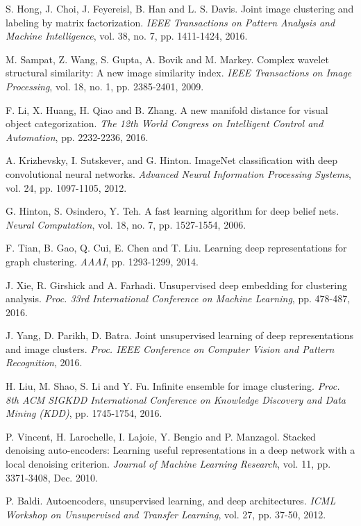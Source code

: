 \documentclass[preprint,12pt]{elsarticle}
\begin{document}
\begin{thebibliography}{99}
S. Hong, J. Choi, J. Feyereisl, B. Han and L. S. Davis. Joint image clustering and labeling by matrix factorization.
\textit{IEEE Transactions on Pattern Analysis and Machine Intelligence}, vol. 38, no. 7, pp. 1411-1424, 2016.

M. Sampat, Z. Wang, S. Gupta, A. Bovik and M. Markey. Complex wavelet structural similarity: A new image similarity index.
\textit{IEEE Transactions on Image Processing}, vol. 18, no. 1, pp. 2385-2401, 2009.

F. Li, X. Huang, H. Qiao and B. Zhang. A new manifold distance for visual object categorization.
\textit{The 12th World Congress on Intelligent Control and Automation}, pp. 2232-2236, 2016.

A. Krizhevsky, I. Sutskever, and G. Hinton. ImageNet classification with deep convolutional neural networks.
\textit{Advanced Neural Information Processing Systems}, vol. 24, pp. 1097-1105, 2012.

G. Hinton, S. Osindero, Y. Teh. A fast learning algorithm for deep belief nets.
\textit{Neural Computation}, vol. 18, no. 7, pp. 1527-1554, 2006.

F. Tian, B. Gao, Q. Cui, E. Chen and T. Liu. Learning deep representations for graph clustering.
\textit{AAAI}, pp. 1293-1299, 2014.

J. Xie, R. Girshick and A. Farhadi. Unsupervised deep embedding for clustering analysis.
\textit{Proc. 33rd International Conference on Machine Learning}, pp. 478-487, 2016.

J. Yang, D. Parikh, D. Batra. Joint unsupervised learning of deep representations and image clusters.
\textit{Proc. IEEE Conference on Computer Vision and Pattern Recognition}, 2016.

H. Liu, M. Shao, S. Li and Y. Fu. Infinite ensemble for image clustering.
\textit{Proc. 8th ACM SIGKDD International Conference on Knowledge Discovery and Data Mining (KDD)},
pp. 1745-1754, 2016.

P. Vincent, H. Larochelle, I. Lajoie, Y. Bengio and P. Manzagol. Stacked denoising auto-encoders: Learning useful representations
in a deep network with a local denoising criterion. \textit{Journal of Machine Learning Research}, vol. 11,
pp. 3371-3408, Dec. 2010.

P. Baldi. Autoencoders, unsupervised learning, and deep architectures.
\textit{ICML Workshop on Unsupervised and Transfer Learning}, vol. 27, pp. 37-50, 2012.


\end{thebibliography}
\end{document}
